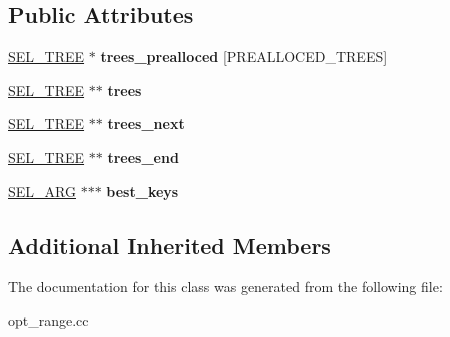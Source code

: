 \subsection*{Public Attributes}
\begin{DoxyCompactItemize}
\item 
\mbox{\label{classSEL__IMERGE_acb0001dba4d211548b18cb89e6d8d58b}} 
\mbox{\hyperlink{classSEL__TREE}{S\+E\+L\+\_\+\+T\+R\+EE}} $\ast$ {\bfseries trees\+\_\+prealloced} \mbox{[}P\+R\+E\+A\+L\+L\+O\+C\+E\+D\+\_\+\+T\+R\+E\+ES\mbox{]}
\item 
\mbox{\label{classSEL__IMERGE_afe73aa3068c09c93edea153598d0aec8}} 
\mbox{\hyperlink{classSEL__TREE}{S\+E\+L\+\_\+\+T\+R\+EE}} $\ast$$\ast$ {\bfseries trees}
\item 
\mbox{\label{classSEL__IMERGE_a66135d2d14e6753ac389d992d928999d}} 
\mbox{\hyperlink{classSEL__TREE}{S\+E\+L\+\_\+\+T\+R\+EE}} $\ast$$\ast$ {\bfseries trees\+\_\+next}
\item 
\mbox{\label{classSEL__IMERGE_a02b156e5f84f27b0da8c69eaa94c8096}} 
\mbox{\hyperlink{classSEL__TREE}{S\+E\+L\+\_\+\+T\+R\+EE}} $\ast$$\ast$ {\bfseries trees\+\_\+end}
\item 
\mbox{\label{classSEL__IMERGE_a23dfec1d3b8a8c8bce462a31aed7bab6}} 
\mbox{\hyperlink{classSEL__ARG}{S\+E\+L\+\_\+\+A\+RG}} $\ast$$\ast$$\ast$ {\bfseries best\+\_\+keys}
\end{DoxyCompactItemize}
\subsection*{Additional Inherited Members}


The documentation for this class was generated from the following file\+:\begin{DoxyCompactItemize}
\item 
opt\+\_\+range.\+cc\end{DoxyCompactItemize}
